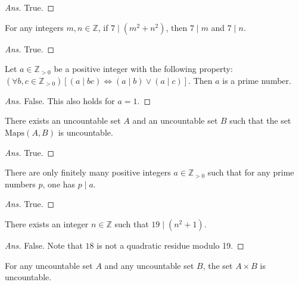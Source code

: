 \documentclass[12pt]{article}
\newenvironment{problem}[2][Problem]{\begin{trivlist}
\item[\hskip \labelsep {\bfseries #1}\hskip \labelsep {\bfseries #2.}]}{\end{trivlist}}
\begin{document}
\begin{proof}[Ans]
True.
\end{proof}

\begin{problem}{45}
For any integers $m, n \in \mathbb{Z}$, if $7 \mid (m^2 + n^2)$, then $7 \mid m$ and $7 \mid n$.
\end{problem}

\begin{proof}[Ans]
True.
\end{proof}

\begin{problem}{46}
Let $a \in \mathbb{Z}_{>0}$ be a positive integer with the following property: \newline $(\forall b, c \in \mathbb{Z}_{>0}) \left[ (a \mid bc) \Leftrightarrow (a \mid b) \lor (a \mid c) \right]$. Then $a$ is a prime number. \end{problem}

\begin{proof}[Ans]
False. This also holds for $a = 1$.
\end{proof}

\begin{problem}{47}
There exists an uncountable set $A$ and an uncountable set $B$ such that the set $\text{Maps}(A, B)$ is uncountable.
\end{problem}

\begin{proof}[Ans]
True.
\end{proof}

\begin{problem}{48}
There are only finitely many positive integers $a \in \mathbb{Z}_{>0}$ such that for any prime numbers $p$, one has $p \mid a$.
\end{problem}

\begin{proof}[Ans]
True.
\end{proof}

\begin{problem}{49}
There exists an integer $n \in \mathbb{Z}$ such that $19 \mid (n^2 + 1)$.
\end{problem}

\begin{proof}[Ans]
False. Note that $18$ is not a quadratic residue modulo 19.
\end{proof}

\begin{problem}{50}
For any uncountable set $A$ and any uncountable set $B$, the set $A \times B$ is uncountable.
\end{problem}
\end{document}
